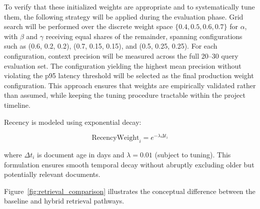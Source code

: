 \documentclass[12pt,a4paper]{report}
\begin{document}
To verify that these initialized weights are appropriate and to systematically tune them, the following strategy will be applied during the evaluation phase. Grid search will be performed over the discrete weight space $\{0.4, 0.5, 0.6, 0.7\}$ for $\alpha$, with $\beta$ and $\gamma$ receiving equal shares of the remainder, spanning configurations such as (0.6, 0.2, 0.2), (0.7, 0.15, 0.15), and (0.5, 0.25, 0.25). For each configuration, context precision will be measured across the full 20--30 query evaluation set. The configuration yielding the highest mean precision without violating the p95 latency threshold will be selected as the final production weight configuration. This approach ensures that weights are empirically validated rather than assumed, while keeping the tuning procedure tractable within the project timeline.

Recency is modeled using exponential decay:

\begin{equation}
  \text{RecencyWeight}_i = e^{-\lambda \Delta t_i}
  \label{eq:recency}
\end{equation}

where $\Delta t_i$ is document age in days and $\lambda = 0.01$ (subject to tuning). This formulation ensures smooth temporal decay without abruptly excluding older but potentially relevant documents.

Figure~\ref{fig:retrieval_comparison} illustrates the conceptual difference between the baseline and hybrid retrieval pathways.
\end{document}
